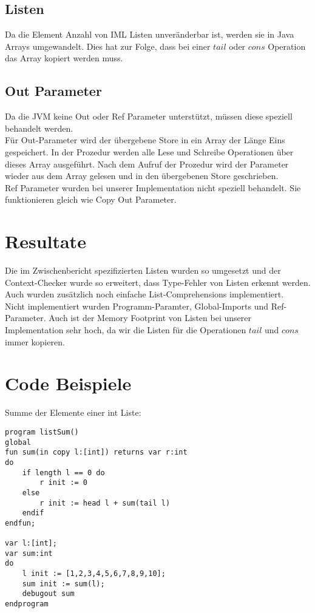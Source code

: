 \documentclass[a4paper,notitlepage,oneside]{article}
\begin{document}
\subsection{Listen}
Da die Element Anzahl von IML Listen unveränderbar ist, werden sie in Java Arrays umgewandelt.
Dies hat zur Folge, dass bei einer $tail$ oder $cons$ Operation das Array kopiert werden muss.

\subsection{Out Parameter}
Da die JVM keine Out oder Ref Parameter unterstützt, müssen diese speziell behandelt werden. \\
Für Out-Parameter wird der übergebene Store in ein Array der Länge Eins gespeichert. In der Prozedur werden alle Lese und Schreibe Operationen über dieses Array ausgeführt. Nach dem Aufruf der Prozedur wird der Parameter wieder aus dem Array gelesen und in den übergebenen Store geschrieben. \\
Ref Parameter wurden bei unserer Implementation nicht speziell behandelt. Sie funktionieren gleich wie Copy Out Parameter.

\section{Resultate}
Die im Zwischenbericht spezifizierten Listen wurden so umgesetzt und der Context-Checker wurde so erweitert, dass Type-Fehler von Listen erkennt werden. Auch wurden zusätzlich noch einfache List-Comprehensions implementiert.\\ Nicht implementiert wurden Programm-Paramter, Global-Imports und Ref-Parameter. Auch ist der Memory Footprint von Listen bei unserer Implementation sehr hoch, da wir die Listen für die Operationen $tail$ und $cons$ immer kopieren.

\newpage
\section{Code Beispiele}
Summe der Elemente einer int Liste:
\begin{lstlisting}[language=iml, caption=Beispiel für die Berechnung der Summe der Element einer Liste in IML]
program listSum()
global
fun sum(in copy l:[int]) returns var r:int
do
	if length l == 0 do
		r init := 0
	else
		r init := head l + sum(tail l)
	endif
endfun;

var l:[int];
var sum:int
do
	l init := [1,2,3,4,5,6,7,8,9,10];
	sum init := sum(l);
	debugout sum
endprogram
\end{lstlisting}
\end{document}
